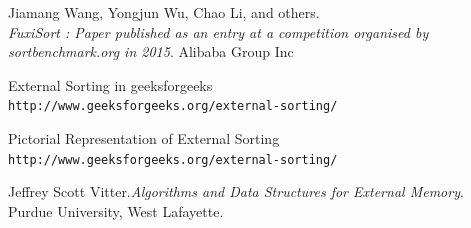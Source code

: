 \documentclass[12pt]{article}
\begin{document}
  

%
%
\begin{thebibliography}{9}
	Jiamang Wang, Yongjun Wu, Chao Li, and others.
	\\\textit{FuxiSort : Paper published as an entry at a competition organised by sortbenchmark.org in 2015}.
	Alibaba Group Inc	
	
	External Sorting in geeksforgeeks
	\\\texttt{http://www.geeksforgeeks.org/external-sorting/}

		Pictorial Representation of External Sorting
		\\\texttt{http://www.geeksforgeeks.org/external-sorting/}

	Jeffrey Scott Vitter.\textit{Algorithms and Data
		Structures for External
		Memory}. 
	Purdue University, West Lafayette.
	
	
	
\end{thebibliography}
\end{document}
